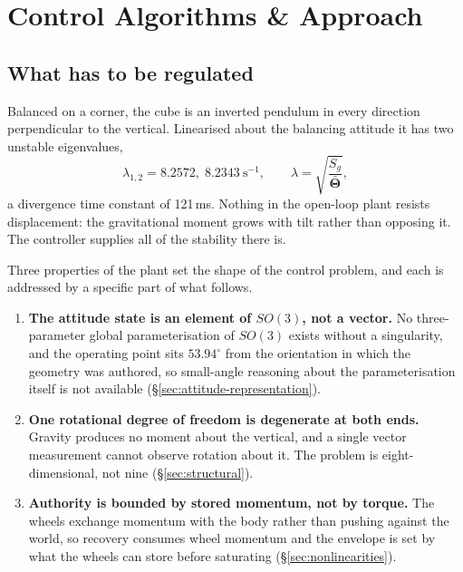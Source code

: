 \section{Control Algorithms \& Approach}
\label{sec:control_algorithms}

\subsection{What has to be regulated}
\label{sec:problem-statement}

Balanced on a corner, the cube is an inverted pendulum in every direction
perpendicular to the vertical. Linearised about the balancing attitude it has
two unstable eigenvalues,
%
\begin{equation}
  \lambda_{1,2} = 8.2572,\; 8.2343\ \mathrm{s^{-1}},
  \qquad
  \lambda = \sqrt{\frac{S_g}{\bar{\bm{\Theta}}}},
  \label{eq:lambda}
\end{equation}
%
a divergence time constant of 121\,ms. Nothing in the open-loop plant resists
displacement: the gravitational moment grows with tilt rather than opposing
it. The controller supplies all of the stability there is.

Three properties of the plant set the shape of the control problem, and each
is addressed by a specific part of what follows.

\begin{enumerate}
  \item \textbf{The attitude state is an element of $SO(3)$, not a vector.}
        No three-parameter global parameterisation of $SO(3)$ exists without
        a singularity, and the operating point sits $53.94^\circ$ from the
        orientation in which the geometry was authored, so small-angle
        reasoning about the parameterisation itself is not available
        (\S\ref{sec:attitude-representation}).
  \item \textbf{One rotational degree of freedom is degenerate at both ends.}
        Gravity produces no moment about the vertical, and a single vector
        measurement cannot observe rotation about it. The problem is
        eight-dimensional, not nine (\S\ref{sec:structural}).
  \item \textbf{Authority is bounded by stored momentum, not by torque.}
        The wheels exchange momentum with the body rather than pushing
        against the world, so recovery consumes wheel momentum and the
        envelope is set by what the wheels can store before saturating
        (\S\ref{sec:nonlinearities}).
\end{enumerate}

